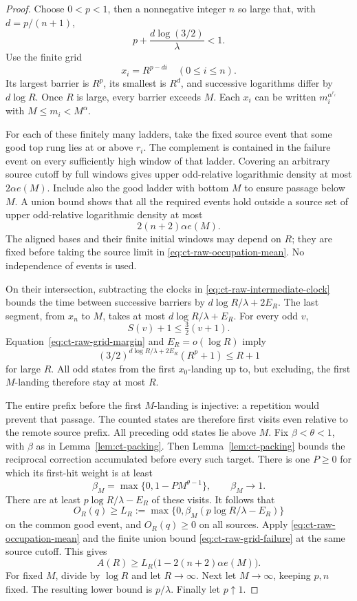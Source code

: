\documentclass[11pt,a4paper]{article}
\begin{document}
\begin{proof}
Choose \(0<p<1\), then a nonnegative integer \(n\) so large that,
with \(d=p/(n+1)\),
\begin{equation}\label{eq:ct-raw-grid-margin}
 p+\frac{d\log(3/2)}{\lambda}<1.
\end{equation}
Use the finite grid
\[
 x_i=R^{p-di}\quad(0\le i\le n).
\]
Its largest barrier is \(R^p\), its smallest is \(R^d\), and
successive logarithms differ by \(d\log R\). Once \(R\) is
large, every barrier exceeds \(M\). Each \(x_i\) can be written
\(m_i^{\alpha^{r_i}}\) with \(M\le m_i<M^\alpha\).

For each of these finitely many ladders, take the fixed source event
that some good top rung lies at or above \(r_i\). The complement
is contained in the failure event on every sufficiently high window
of that ladder. Covering an arbitrary source cutoff by full windows
gives upper odd-relative logarithmic density at most
\(2\alpha e(M)\). Include also the good ladder with bottom \(M\)
to ensure passage below \(M\). A union bound shows that all the
required events hold outside a source set of upper odd-relative
logarithmic density at most
\begin{equation}\label{eq:ct-raw-grid-failure}
 2(n+2)\alpha e(M).
\end{equation}
The aligned bases and their finite initial windows may depend on
\(R\); they are fixed before taking the source limit in
\eqref{eq:ct-raw-occupation-mean}. No independence of events is used.

On their intersection, subtracting the clocks in
\eqref{eq:ct-raw-intermediate-clock} bounds the time between successive
barriers by \(d\log R/\lambda+2E_R\). The last segment, from
\(x_n\) to \(M\), takes at most \(d\log R/\lambda+E_R\).
For every odd \(v\),
\[
 S(v)+1\le\tfrac32(v+1).
\]
Equation~\eqref{eq:ct-raw-grid-margin} and \(E_R=o(\log R)\) imply
\[
 (3/2)^{d\log R/\lambda+2E_R}(R^p+1)\le R+1
\]
for large \(R\). All odd states from the first \(x_0\)-landing up
to, but excluding, the first \(M\)-landing therefore stay at most \(R\).

The entire prefix before the first \(M\)-landing is injective:
a repetition would prevent that passage. The counted states are
therefore first visits even relative to the remote source prefix.
All preceding odd states lie
above \(M\). Fix \(\beta<\theta<1\), with \(\beta\) as in
Lemma~\ref{lem:ct-packing}. Then
Lemma~\ref{lem:ct-packing} bounds the reciprocal correction accumulated
before every such target. There is one \(P\ge0\) for which its
first-hit weight is at least
\[
 \beta_M=\max\{0,1-PM^{\theta-1}\},\qquad \beta_M\longrightarrow1.
\]
There are at least \(p\log R/\lambda-E_R\) of these visits.
It follows that
\[
 O_R(q)\ge L_R:=
 \max\{0,\beta_M(p\log R/\lambda-E_R)\}
\]
on the common good event, and \(O_R(q)\ge0\) on all sources.
Apply \eqref{eq:ct-raw-occupation-mean} and the finite union bound
\eqref{eq:ct-raw-grid-failure} at the same source cutoff. This gives
\[
 A(R)\ge L_R\bigl(1-2(n+2)\alpha e(M)\bigr).
\]
For fixed \(M\), divide by \(\log R\) and let \(R\to\infty\).
Next let \(M\to\infty\), keeping \(p,n\) fixed. The resulting
lower bound is \(p/\lambda\). Finally let \(p\uparrow1\).
\end{proof}
\end{document}
